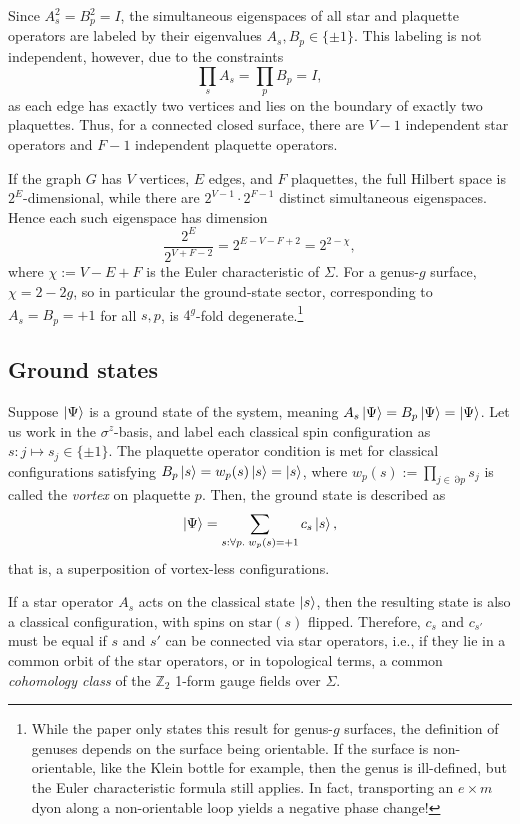 \documentclass{article}
\renewcommand{\star}[1]{\mathrm{star}\left(#1\right)}
\DeclareMathOperator{\bdry}{\partial}
\begin{document}
Since $A_s^2 = B_p^2 = I$, the simultaneous eigenspaces of all star and plaquette operators
are labeled by their eigenvalues $A_s, B_p \in \{\pm 1\}$.
This labeling is not independent, however, due to the constraints
\[
	\prod_s A_s = \prod_p B_p = I,
\]
as each edge has exactly two vertices and lies on the boundary of exactly two plaquettes.
Thus, for a connected closed surface, there are $V-1$ independent star operators and $F-1$ independent plaquette operators.

If the graph $G$ has $V$ vertices, $E$ edges, and $F$ plaquettes, the full Hilbert space is $2^E$-dimensional,
while there are $2^{V-1}\cdot 2^{F-1}$ distinct simultaneous eigenspaces.
Hence each such eigenspace has dimension
\[
	\frac{2^E}{2^{V+F-2}} = 2^{E-V-F+2} = 2^{2-\chi},
\]
where $\chi := V-E+F$ is the Euler characteristic of $\Sigma$.
For a genus-$g$ surface, $\chi=2-2g$, so in particular the ground-state sector,
corresponding to $A_s=B_p=+1$ for all $s, p$, is $4^g$-fold degenerate.\footnote{%
While the paper only states this result for genus-$g$ surfaces,
the definition of genuses depends on the surface being orientable.
If the surface is non-orientable, like the Klein bottle for example,
then the genus is ill-defined, but the Euler characteristic formula still applies.
In fact, transporting an $e\times m$ dyon along a non-orientable loop yields a negative phase change!
}

\subsection{Ground states}
Suppose $\ket{\Psi}$ is a ground state of the system, meaning $A_s \ket{\Psi} = B_p \ket{\Psi} = \ket{\Psi}$.
Let us work in the $\sigma^z$-basis, and label each classical spin configuration as $s: j \mapsto s_j \in \{\pm 1\}$.
The plaquette operator condition is met for classical configurations satisfying $B_p\ket{s} = w_p(s)\ket{s} = \ket{s}$,
where $w_p(s) := \prod_{j \in \bdry{p}} s_j$ is called the \emph{vortex} on plaquette $p$.
Then, the ground state is described as
\[
	\ket{\Psi} = \sum_{s : \forall p.\; w_p(s) = +1} c_s \ket{s},
\]
that is, a superposition of vortex-less configurations.

If a star operator $A_s$ acts on the classical state $\ket{s}$,
then the resulting state is also a classical configuration, with spins on $\star{s}$ flipped.
Therefore, $c_s$ and $c_{s'}$ must be equal if $s$ and $s'$ can be connected via star operators, i.e.,
if they lie in a common orbit of the star operators,
or in topological terms, a common \emph{cohomology class} of the $\mathbb{Z}_2$ 1-form gauge fields over $\Sigma$.
\end{document}
